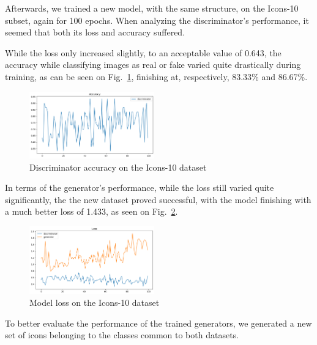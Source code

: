 \documentclass[conference]{IEEEtran}
\begin{document}
Afterwards, we trained a new model, with the same structure, on the Icons-10 subset, again for 100 epochs. When analyzing the discriminator's performance, it seemed that both its loss and accuracy suffered. 

While the loss only increased slightly, to an acceptable value of 0.643, the accuracy while classifying images as real or fake varied quite drastically during training, as can be seen on Fig.~\ref{fig:Icons10Acc}, finishing at, respectively, 83.33\% and 86.67\%.

\begin{figure}[htbp]
    \centering
    \includegraphics[width=0.48\textwidth]{paper/images/icons10/icons10_acc.png}
    \caption{Discriminator accuracy on the Icons-10 dataset}
    \label{fig:Icons10Acc}
\end{figure}

In terms of the generator's performance, while the loss still varied quite significantly, the the new dataset proved successful, with the model finishing with a much better loss of 1.433, as seen on Fig.~\ref{fig:Icons10Loss}.

\begin{figure}[htbp]
    \centering
    \includegraphics[width=0.48\textwidth]{paper/images/icons10/icons10_loss.png}
    \caption{Model loss on the Icons-10 dataset}
    \label{fig:Icons10Loss}
\end{figure}

To better evaluate the performance of the trained generators, we generated a new set of icons belonging to the classes common to both datasets.
\end{document}
